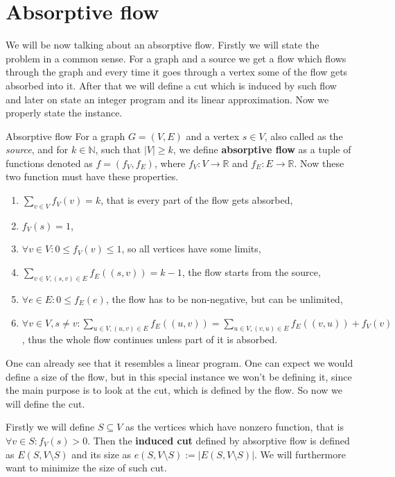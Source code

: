 \documentclass{article}
\begin{document}
	\section{Absorptive flow}
	
	We will be now talking about an absorptive flow. Firstly we will state the problem in a common sense. For a graph and a source we get a flow which flows through the graph and every time it goes through a vertex some of the flow gets absorbed into it. After that we will define a cut which is induced by such flow and later on state an integer program and its linear approximation. Now we properly state the instance.
	
	\begin{defn}{Absorptive flow}
		For a graph $G = (V,E)$ and a vertex $s \in V$, also called as the \textit{source}, and for $k \in \mathbb{N}$, such that $|V| \geq k$, we define \textbf{absorptive flow} as a tuple of functions denoted as $f = (f_V, f_E)$, where $f_V : V \to \mathbb{R}$ and $f_E : E \to \mathbb{R}$. Now these two function must have these properties.
		
		\begin{enumerate}
			\item $\sum_{v \in V} f_V (v) = k$, that is every part of the flow gets absorbed,
			\item $f_V(s) = 1$,
			\item $\forall v \in V : 0 \leq f_V(v) \leq 1$, so all vertices have some limits,
			\item $\sum_{v \in V, (s,v) \in E} f_E((s,v)) = k-1$, the flow starts from the source,
			\item $\forall e \in E : 0 \leq f_E(e)$, the flow has to be non-negative, but can be unlimited,
			\item $\forall v \in V, s \neq v : \sum_{u \in V, (u,v) \in E} f_E((u,v)) = \sum_{u \in V, (v,u) \in E} f_E((v,u)) + f_V(v)$, thus the whole flow continues unless part of it is absorbed.
		\end{enumerate}
	\end{defn}
	
	One can already see that it resembles a linear program. One can expect we would define a size of the flow, but in this special instance we won't be defining it, since the main purpose is to look at the cut, which is defined by the flow. So now we will define the cut.
	
	Firstly we will define $S \subseteq V$ as the vertices which have nonzero function, that is $\forall v \in S : f_V(s) > 0$. Then the \textbf{induced cut} defined by absorptive flow is defined as $E(S, V \setminus S)$ and its size as $e(S, V \setminus S) := |E(S, V \setminus S)|$. We will furthermore want to minimize the size of such cut.
	
\end{document}
